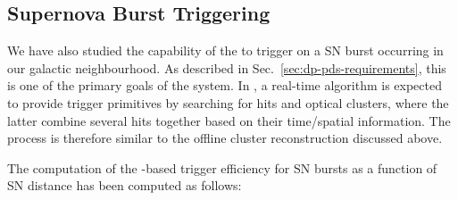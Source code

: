 
\subsection{Supernova Burst Triggering}

We have also studied the capability of the   to trigger on a SN burst occurring in our galactic neighbourhood. As described in Sec.~\ref{sec:dp-pds-requirements}, this is one of the primary goals of the system. In , a real-time algorithm is expected to provide trigger primitives by searching for  hits and optical clusters, where the latter combine several hits together based on their time/spatial information. The process is therefore similar to the offline cluster reconstruction discussed above. 

The computation of the -based trigger efficiency for SN bursts as a function of SN distance has been computed as follows:

